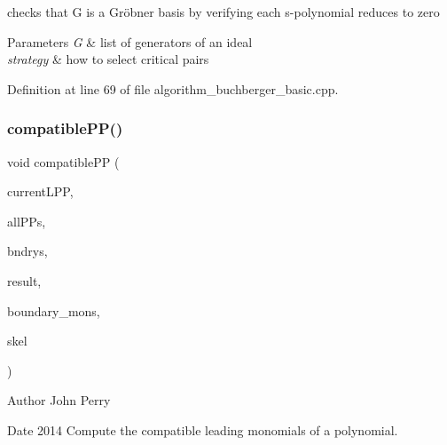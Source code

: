 checks that {\ttfamily G} is a Gr\"{o}bner basis by verifying each s-\/polynomial reduces to zero 


\begin{DoxyParams}{Parameters}
{\em G} & list of generators of an ideal \\
\hline
{\em strategy} & how to select critical pairs \\
\hline
\end{DoxyParams}


Definition at line 69 of file algorithm\+\_\+buchberger\+\_\+basic.\+cpp.

\mbox{\label{group___g_b_computation_gaa9f8343bd8b21f30062b2844e2772b5e}} 
\subsubsection{\texorpdfstring{compatible\+P\+P()}{compatiblePP()}}
{\footnotesize\ttfamily void compatible\+PP (\begin{DoxyParamCaption}\item[{\hyperlink{group__polygroup_class_monomial}{Monomial}}]{current\+L\+PP,  }\item[{const set$<$ \hyperlink{group__polygroup_class_monomial}{Monomial} $>$ \&}]{all\+P\+Ps,  }\item[{const set$<$\+::\hyperlink{group___c_l_s_solvers_classray}{ray} $>$ \&}]{bndrys,  }\item[{set$<$ \hyperlink{group__polygroup_class_monomial}{Monomial} $>$ \&}]{result,  }\item[{set$<$ \hyperlink{group__polygroup_class_monomial}{Monomial} $>$ \&}]{boundary\+\_\+mons,  }\item[{\hyperlink{group___c_l_s_solvers_class_l_p___solver}{L\+P\+\_\+\+Solver} $\ast$}]{skel }\end{DoxyParamCaption})}

\begin{DoxyAuthor}{Author}
John Perry 
\end{DoxyAuthor}
\begin{DoxyDate}{Date}
2014 Compute the compatible leading monomials of a polynomial. 
\end{DoxyDate}

